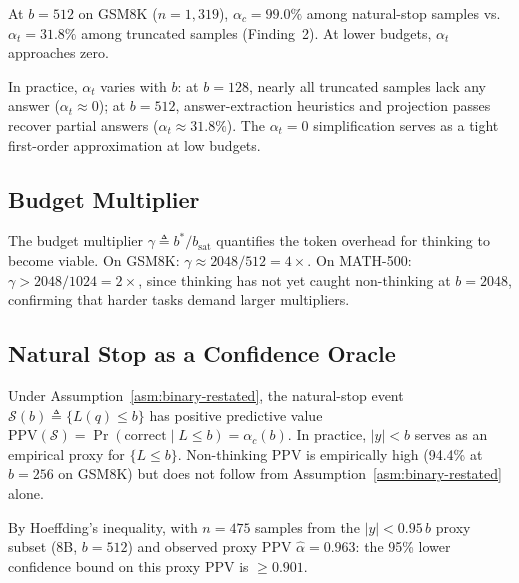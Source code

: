 \noindent
At $b{=}512$ on GSM8K ($n{=}1{,}319$), $\alpha_c = 99.0\%$ among natural-stop samples vs.\
$\alpha_t = 31.8\%$ among truncated samples (Finding~2).
At lower budgets, $\alpha_t$ approaches zero.

\begin{remark}
In practice, $\alpha_t$ varies with $b$: at $b{=}128$, nearly all
truncated samples lack any answer ($\alpha_t \approx 0$);
at $b{=}512$, answer-extraction heuristics and projection passes
recover partial answers ($\alpha_t \approx 31.8\%$).
The $\alpha_t = 0$ simplification serves as a tight first-order
approximation at low budgets.
\end{remark}

\subsection{Budget Multiplier}

\begin{corollary}
\label{cor:multiplier-restated}
The budget multiplier $\gamma \triangleq b^*/b_{\mathrm{sat}}$ quantifies
the token overhead for thinking to become viable.
On GSM8K: $\gamma \approx 2048/512 = 4\times$.
On MATH-500: $\gamma > 2048/1024 = 2\times$, since thinking has not yet caught non-thinking at $b{=}2048$, confirming that harder tasks demand larger multipliers.
\end{corollary}

\subsection{Natural Stop as a Confidence Oracle}

\begin{proposition}
\label{prop:oracle-restated}
Under Assumption~\ref{asm:binary-restated}, the natural-stop event
$\mathcal{S}(b) \triangleq \{L(q) \le b\}$ has positive predictive value
$\mathrm{PPV}(\mathcal{S}) = \Pr(\mathrm{correct} \mid L \le b) = \alpha_c(b)$.
In practice, $|y| < b$ serves as an empirical proxy for $\{L \le b\}$.
Non-thinking PPV is empirically high (94.4\% at $b{=}256$ on GSM8K)
but does not follow from Assumption~\ref{asm:binary-restated} alone.
\end{proposition}

\noindent
By Hoeffding's inequality, with $n{=}475$ samples from the
$|y| < 0.95\,b$ proxy subset (8B, $b{=}512$)
and observed proxy PPV $\hat{\alpha} = 0.963$:
the 95\% lower confidence bound on this proxy PPV is $\ge 0.901$.

